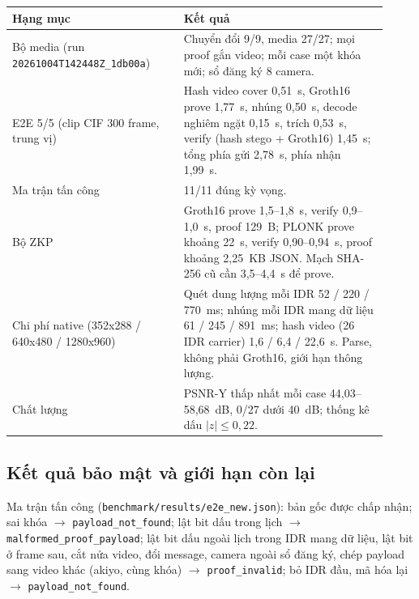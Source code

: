 \documentclass[11pt,a4paper]{article}
\begin{document}
\begin{center}
\small
\begin{tabular}{p{0.42\linewidth}p{0.50\linewidth}}
\toprule
Hạng mục & Kết quả \\
\midrule
Bộ media (run \texttt{20261004T142448Z\_1db00a}) & Chuyển đổi 9/9, media 27/27; mọi proof gắn video; mỗi case một khóa mới; sổ đăng ký 8 camera. \\
E2E 5/5 (clip CIF 300 frame, trung vị) & Hash video cover 0{,}51~s, Groth16 prove 1{,}77~s, nhúng 0{,}50~s, decode nghiêm ngặt 0{,}15~s, trích 0{,}53~s, verify (hash stego + Groth16) 1{,}45~s; tổng phía gửi 2{,}78~s, phía nhận 1{,}99~s. \\
Ma trận tấn công & 11/11 đúng kỳ vọng. \\
Bộ ZKP & Groth16 prove 1{,}5--1{,}8~s, verify 0{,}9--1{,}0~s, proof 129~B; PLONK prove khoảng 22~s, verify 0{,}90--0{,}94~s, proof khoảng 2{,}25~KB JSON. Mạch SHA-256 cũ cần 3{,}5--4{,}4~s để prove. \\
Chi phí native (352x288 / 640x480 / 1280x960) & Quét dung lượng mỗi IDR 52 / 220 / 770~ms; nhúng mỗi IDR mang dữ liệu 61 / 245 / 891~ms; hash video (26 IDR carrier) 1{,}6 / 6{,}4 / 22{,}6~s. Parse, không phải Groth16, giới hạn thông lượng. \\
Chất lượng & PSNR-Y thấp nhất mỗi case 44{,}03--58{,}68~dB, 0/27 dưới 40~dB; thống kê dấu \(|z| \le 0{,}22\). \\
\bottomrule
\end{tabular}
\end{center}

\subsection{Kết quả bảo mật và giới hạn còn lại}

Ma trận tấn công (\texttt{benchmark/results/e2e\_new.json}): bản gốc được chấp nhận;
sai khóa \(\rightarrow\) \texttt{payload\_not\_found}; lật bit dấu trong lịch
\(\rightarrow\) \texttt{malformed\_proof\_payload}; lật bit dấu ngoài lịch trong IDR
mang dữ liệu, lật bit ở frame sau, cắt nửa video, đổi message, camera ngoài sổ đăng ký,
chép payload sang video khác (akiyo, cùng khóa) \(\rightarrow\) \texttt{proof\_invalid};
bỏ IDR đầu, mã hóa lại \(\rightarrow\) \texttt{payload\_not\_found}.
\end{document}
